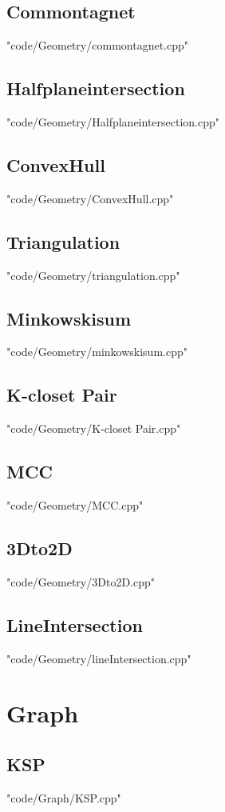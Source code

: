 \documentclass [8pt,a4paper,twocolumn]{article}
\begin{document}
\subsection{Commontagnet}
 {"code/Geometry/commontagnet.cpp"}
\subsection{Halfplaneintersection}
 {"code/Geometry/Halfplaneintersection.cpp"}
\subsection{ConvexHull}
 {"code/Geometry/ConvexHull.cpp"}
\subsection{Triangulation}
 {"code/Geometry/triangulation.cpp"}
\subsection{Minkowskisum}
 {"code/Geometry/minkowskisum.cpp"}
\subsection{K-closet Pair}
 {"code/Geometry/K-closet Pair.cpp"}
\subsection{MCC}
 {"code/Geometry/MCC.cpp"}
\subsection{3Dto2D}
 {"code/Geometry/3Dto2D.cpp"}
\subsection{LineIntersection}
 {"code/Geometry/lineIntersection.cpp"}
\section{Graph}
\subsection{KSP}
 {"code/Graph/KSP.cpp"}
\end{document}
